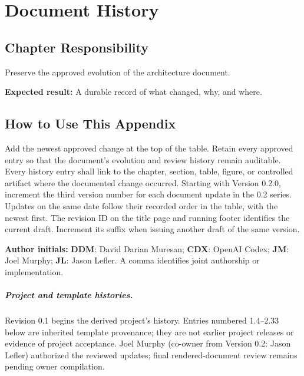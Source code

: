 \chapter{Document History}
\section{Chapter Responsibility}
\label{Section:DocumentHistoryResponsibility}
Preserve the approved evolution of the architecture document.

\noindent\textbf{Expected result:} A durable record of what changed, why, and where.

\section{How to Use This Appendix}
Add the newest approved change at the top of the table. Retain every approved
entry so that the document's evolution and review history remain auditable.
Every history entry shall link to the chapter, section, table, figure, or
controlled artifact where the documented change occurred.
Starting with Version 0.2.0, increment the third version number for each
document update in the 0.2 series. Updates on the same date follow their
recorded order in the table, with the newest first. The revision ID on the
title page and running footer identifies the current draft. Increment its
suffix when issuing another draft of the same version.

\noindent\textbf{Author initials:} \textbf{DDM}: David Darian Muresan;
\textbf{CDX}: OpenAI Codex; \textbf{JM}: Joel Murphy; \textbf{JL}: Jason Lefler. A comma identifies joint authorship or implementation.

\paragraph{Project and template histories.}
Revision 0.1 begins the derived project's history. Entries numbered 1.4--2.33
below are inherited template provenance; they are not earlier project releases
or evidence of project acceptance. Joel Murphy (co-owner from Version 0.2: Jason Lefler) authorized the reviewed updates;
final rendered-document review remains pending owner compilation.

